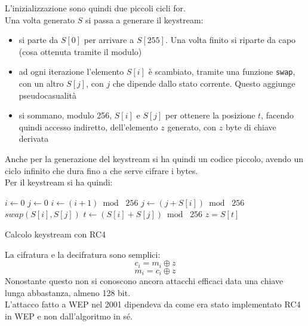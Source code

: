 \documentclass[a4paper,12pt, oneside]{book}
\begin{document}
L'inizializzazione sono quindi due piccoli cicli for.\\
Una volta generato $S$ si passa a generare il keystream:
\begin{itemize}
  \item si parte da $S[0]$ per arrivare a $S[255]$. Una volta finito si riparte
  da capo (cosa ottenuta tramite il modulo)
  \item ad ogni iterazione l'elemento $S[i]$ è scambiato, tramite una funzione
  \texttt{swap}, con un altro $S[j]$, con $j$ che dipende dallo stato
  corrente. Questo aggiunge pseudocasualità
  \item si sommano, modulo 256, $S[i]$ e $S[j]$ per ottenere la posizione $t$,
  facendo quindi accesso indiretto,
  dell'elemento $z$ generato, con $z$ byte di chiave derivata
\end{itemize}
Anche per la generazione del keystream si ha quindi un codice piccolo, avendo un
ciclo infinito che dura fino a che serve cifrare i bytes.  \\
Per il keystream si ha quindi:
\begin{algorithm}[H]
  \begin{algorithmic}
    \State $i\gets 0$
    \State $j\gets 0$
    \While {$\top$}
    \State $i\gets (i+1)\bmod\,\,256$
    \State $j\gets (j+S[i])\bmod\,\,256$
    \State $swap(S[i],S[j])$
    \State $t\gets (S[i]+S[j])\bmod\,\,256$
    \State $z=S[t]$
    \EndWhile
  \end{algorithmic}
  \caption{Calcolo keystream con RC4}
\end{algorithm}
La cifratura e la decifratura sono semplici:
\[c_i=m_i\oplus z\]
\[m_i=c_i\oplus z\]
Nonostante questo non si conoscono ancora attacchi efficaci data una chiave
lunga abbastanza, almeno 128 bit.\\
L'attacco fatto a WEP nel 2001 dipendeva da come era stato implementato RC4 in
WEP e non dall'algoritmo in sé.
\end{document}
